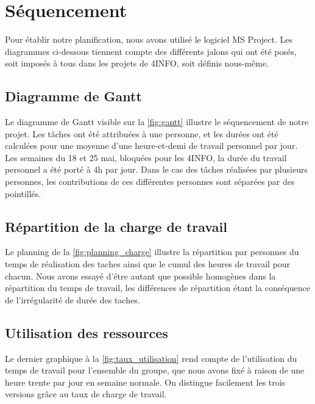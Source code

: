 \section{Séquencement}
	\label{sec:sequencement}
	Pour établir notre planification, nous avons utilisé le logiciel MS Project. Les diagrammes ci-dessous tiennent compte des différents jalons qui ont été posés, soit imposés à tous dans les projets de 4INFO, soit définis nous-même.

	\subsection{Diagramme de Gantt}
		Le diagramme de Gantt visible sur la \ffigure{} \ref{fig:gantt} illustre le séquencement de notre projet. Les tâches ont été attribuées à une personne, et les durées ont été calculées pour une moyenne d'une heure-et-demi de travail personnel par jour. Les semaines du 18 et 25 mai, bloquées pour les 4INFO, la durée du travail personnel a été porté à 4h par jour. Dans le cas des tâches réalisées par plusieurs personnes, les contributions de ces différentes personnes sont séparées par des pointillés.  
	
	\subsection{Répartition de la charge de travail}
		Le planning de la \ffigure{} \ref{fig:planning_charge} illustre la répartition par personnes du temps de réalisation des taches ainsi que le cumul des heures de travail pour chacun. Nous avons essayé d'être autant que possible homogènes dans la répartition du temps de travail, les différences de répartition étant la conséquence de l'irrégularité de durée des taches.

	\subsection{Utilisation des ressources}
		Le dernier graphique à la \ffigure{} \ref{fig:taux_utilisation} rend compte de l'utilisation du temps de travail pour l'ensemble du groupe, que nous avons fixé à raison de une heure trente par jour en semaine normale. On distingue facilement les trois versions grâce au taux de charge de travail.  

